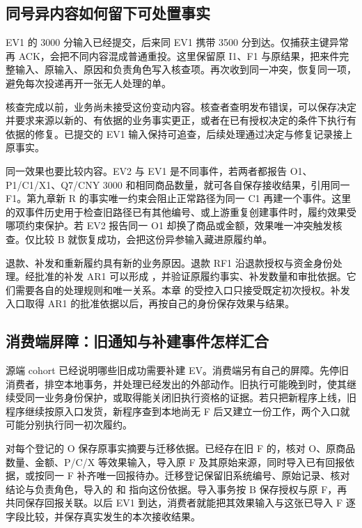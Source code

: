 \subsection*{同号异内容如何留下可处置事实}

EV1 的 3000 分输入已经提交，后来同 EV1 携带 3500 分到达。仅捕获主键异常再 ACK，会把不同内容混成普通重投。这里保留原 I1、F1 与原结果，把来件完整输入、原输入、原因和负责角色写入核查项。再次收到同一冲突，恢复同一项，避免每次投递再开一张无人处理的单。

核查完成以前，业务尚未接受这份变动内容。核查者查明发布错误，可以保存决定并要求来源以新的、有依据的业务事实更正，或者在已有授权决定的条件下执行有依据的修复。已提交的 EV1 输入保持可追查，后续处理通过决定与修复记录接上原事实。

同一效果也要比较内容。EV2 与 EV1 是不同事件，若两者都报告 O1、P1/C1/X1、Q7/CNY 3000 和相同商品数量，就可各自保存接收结果，引用同一 F1。第九章新 R 的事实唯一约束会阻止正常路径为同一 C1 再建一个事件。这里的双事件历史用于检查旧路径已有其他编号、或上游重复创建事件时，履约效果受哪项约束保护。若 EV2 报告同一 O1 却换了商品或金额，效果唯一冲突触发核查。仅比较 B 就恢复成功，会把这份异参输入藏进原履约单。


退款、补发和重新履约具有新的业务原因。退款 RF1 沿退款授权与资金身份处理。经批准的补发 AR1 可以形成 ，并验证原履约事实、补发数量和审批依据。它们需要各自的处理规则和唯一关系。本章  的受控入口只接受既定初次授权。补发入口取得 AR1 的批准依据以后，再按自己的身份保存效果与结果。



\subsection*{消费端屏障：旧通知与补建事件怎样汇合}

源端 cohort 已经说明哪些旧成功需要补建 EV。消费端另有自己的屏障。先停旧消费者，排空本地事务，并处理已经发出的外部动作。旧执行可能晚到时，使其继续受同一业务身份保护，或取得能关闭旧执行资格的证据。若只把新程序上线，旧程序继续按原入口发货，新程序查到本地尚无 F 后又建立一份工作，两个入口就可能分别执行同一初次履约。

对每个登记的 O 保存原事实摘要与迁移依据。已经存在旧 F 的，核对 O、原商品数量、金额、P/C/X 等效果输入，导入原 F 及其原始来源，同时导入已有回报依据，或按同一 F 补齐唯一回报待办。迁移登记保留旧系统编号、原始记录、核对结论与负责角色，导入的  和  指向这份依据。导入事务按 B 保存授权与原 F，再共同保存回报关联。以后 EV1 到达，消费者就能把其效果输入与这张已导入 F 逐字段比较，并保存真实发生的本次接收结果。

